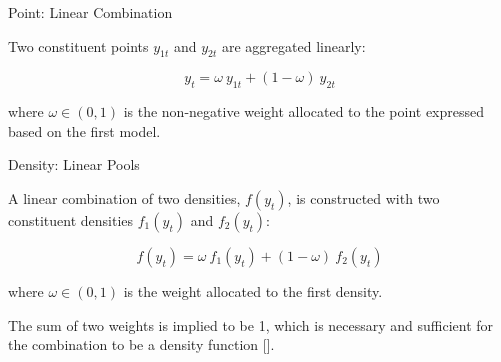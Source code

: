 \begin{frame}{Point: Linear Combination}
    
    Two constituent points $y_{1t}$ and $y_{2t}$ are aggregated linearly:
    
    \vspace{3mm}
    
    \begin{equation}
    \label{eqn:PC1}
    y_t = \omega \ y_{1t} + (1-\omega) \ y_{2t}
    \end{equation}
    
    \vspace{3mm}
    
    where $\omega\in(0,1)$ is the non-negative weight allocated to the point expressed based on the first model.

\end{frame}



\begin{frame}{Density: Linear Pools}
		
        A linear combination of two densities, $f(y_t)$, is constructed with two constituent densities $f_1(y_t)$ and $f_2(y_t)$:
        
        \vspace{3mm}
        
        \begin{equation}
        f(y_t) = \omega \ f_1(y_t) + (1-\omega) \ f_2(y_t)
        \end{equation}  
        
        \vspace{3mm}
        
        where $\omega\in(0,1)$ is the weight allocated to the first density.

        \vspace{4mm}

        \small{The sum of two weights is implied to be 1, which is necessary and sufficient for the combination to be a density function [\cite{GA11}].}
        
\end{frame}



